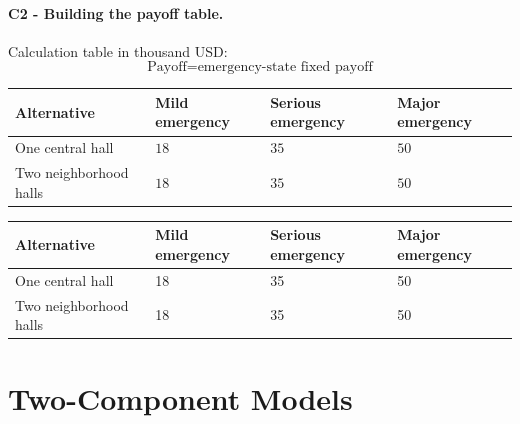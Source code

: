
	\paragraph*{C2 - Building the payoff table.}
	\label{subsec:problem13-community-hall-emergency-rentals-c2}
	Calculation table in thousand USD:
	\[
	\text{Payoff}=\text{emergency-state fixed payoff}
	\]
	\begin{center}
		\begin{tabular}{llll}
			\toprule
			Alternative & Mild emergency & Serious emergency & Major emergency \\
			\midrule
			One central hall & $18$ & $35$ & $50$ \\
			Two neighborhood halls & $18$ & $35$ & $50$ \\
			\bottomrule
		\end{tabular}
	\end{center}

	\begin{center}
		\begin{tabular}{llll}
			\toprule
			Alternative & Mild emergency & Serious emergency & Major emergency \\
			\midrule
			One central hall & 18 & 35 & 50 \\
			Two neighborhood halls & 18 & 35 & 50 \\
			\bottomrule
		\end{tabular}
	\end{center}


	\section{Two-Component Models}
	\label{sec:two-component-models}


